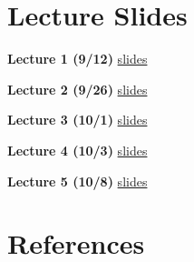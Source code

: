 \documentclass[]{book}
\theoremstyle{definition}
\theoremstyle{definition}
\theoremstyle{definition}
\theoremstyle{remark}
\begin{document}
\hypertarget{appendix-appendix}{%
\appendix}


\hypertarget{lecture-slides}{%
\chapter{Lecture Slides}\label{lecture-slides}}

\textbf{Lecture 1 (9/12)} \href{./lectures/lecture01/lec01_slides.html}{slides}

\textbf{Lecture 2 (9/26)} \href{./lectures/lecture02/lec02_slides.html}{slides}

\textbf{Lecture 3 (10/1)} \href{./lectures/lecture03/lec03_slides.html}{slides}

\textbf{Lecture 4 (10/3)} \href{./lectures/lecture04/lec04_slides.html}{slides}

\textbf{Lecture 5 (10/8)} \href{./lectures/lecture05/lec05_slides.html}{slides}

\hypertarget{references}{%
\chapter*{References}\label{references}}


\end{document}
